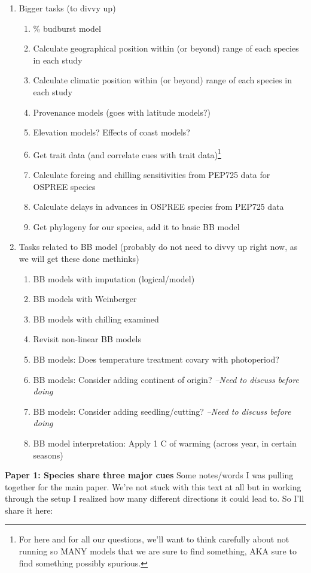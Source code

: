 \documentclass[11pt,letterpaper]{article}
\begin{document}
\begin{enumerate}
\item Bigger tasks (to divvy up)
\begin{enumerate}
\item \% budburst model
\item Calculate geographical position within (or beyond) range of each species in each study
\item Calculate climatic position within (or beyond) range of each species in each study
\item Provenance models (goes with latitude models?)
\item Elevation models? Effects of coast models?
\item Get trait data (and correlate cues with trait data)\footnote{For here and for all our questions, we'll want to think carefully about not running so MANY models that we are sure to find something, AKA sure to find something possibly spurious.}
\item Calculate forcing and chilling sensitivities from PEP725 data for OSPREE species
\item Calculate delays in advances in OSPREE species from PEP725 data
\item Get phylogeny for our species, add it to basic BB model
\end{enumerate}
\item Tasks related to BB model (probably do not need to divvy up right now, as we will get these done methinks)
\begin{enumerate}
\item BB models with imputation (logical/model)
\item BB models with Weinberger
\item BB models with chilling examined
\item Revisit non-linear BB models 
\item BB models: Does temperature treatment covary with photoperiod?
\item BB models: Consider adding continent of origin? \emph{--Need to discuss before doing}
\item BB models: Consider adding seedling/cutting? \emph{--Need to discuss before doing}
\item BB model interpretation: Apply 1 C of warming (across year, in certain seasons)
\end{enumerate}
\end{enumerate} 

\newpage
{\bf Paper 1: Species share three major cues} %
Some notes/words I was pulling together for the main paper. We're not stuck with this text at all but in working through the setup I realized how many different directions it could lead to. So I'll share it here:
\end{document}
